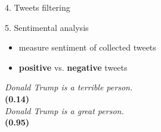 \documentclass{beamer}
\begin{document}
\begin{frame}[fragile]
\begin{columns}[T]
\begin{column}{.33\textwidth}
\begin{blankblock}{4. Tweets filtering}
\begin{itemize}
\end{itemize}
\end{blankblock}
\begin{blankblock}{5. Sentimental analysis}
\begin{itemize}
    \item measure sentiment of collected tweets
    \item \textbf{positive} vs. \textbf{negative} tweets
\end{itemize}
\center
\textit{Donald Trump is a terrible person.}\\
\textbf{(0.14)}\\
\vspace{0.5cm}
\textit{Donald Trump is a great person.}\\
\textbf{(0.95)}
\end{blankblock}

\end{column}
\begin{column}{.63\textwidth}


\end{column}
\end{columns}
\end{frame}
\end{document}
